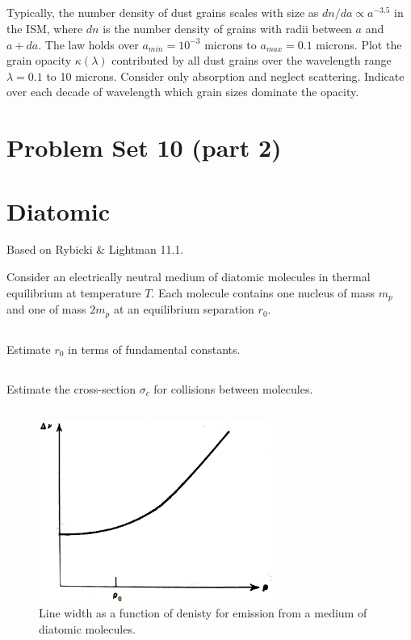\documentclass[11pt]{article}
\begin{document}
\subsection{}
Typically, the number density of dust grains scales with size as $dn/da\propto a^{-3.5}$ in
the ISM, where $dn$ is the number density of grains with radii between $a$ and $a+da$.  The
law holds over $a_{min}=10^{-3}$ microns to $a_{max}=0.1$ microns.  Plot the grain opacity
$\kappa(\lambda)$ contributed by all dust grains over the wavelength range $\lambda=0.1$ to
10 microns.  Consider only absorption and neglect scattering.  Indicate over each decade of
wavelength which grain sizes dominate the opacity.


\section*{Problem Set 10 (part 2)}

\section{Diatomic}

Based on Rybicki \& Lightman 11.1.

Consider an electrically neutral medium of diatomic molecules in thermal equilibrium at
temperature $T$.  Each molecule contains one nucleus of mass $m_p$ and one of mass $2m_p$
at an equilibrium separation $r_0$.

\subsection{}
Estimate $r_0$ in terms of fundamental constants.

\subsection{}
Estimate the cross-section $\sigma_c$ for collisions between molecules.

\subsection{}
\begin{figure}
\includegraphics[width=3in]{ps11_linewidth.png}
\caption{
Line width as a function of denisty for emission from a medium of diatomic molecules.
}\label{fig:linewidth}
\end{figure}
\end{document}
